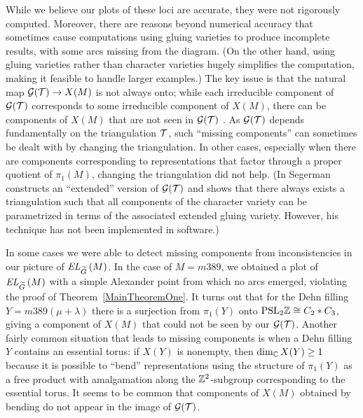\documentclass[tikz, sepfignums, defaultenums]{nmd/article}
\newcommand{\TEL}[1]{\mathit{EL}_\Gtil\left(#1\right)}
\begin{document}
While we believe our plots of these loci are accurate, they were not
rigorously computed.  Moreover, there are reasons beyond numerical
accuracy that sometimes cause computations using gluing varieties to
produce incomplete results, with some arcs missing from the diagram.
(On the other hand, using gluing varieties rather than character
varieties hugely simplifies the computation, making it feasible to
handle larger examples.)  The key issue is that the natural map
${\mathcal G}({\mathcal T}) \to X(M)$ is not always onto; while each irreducible
component of ${\mathcal G}({\mathcal T})$ corresponds to some irreducible component of
$X(M)$, there can be components of $X(M)$ that are not seen in
${\mathcal G}({\mathcal T})$ \cite[\S 10.3]{Dunfield2003}.  As ${\mathcal G}({\mathcal T})$ depends
fundamentally on the triangulation ${\mathcal T}$, such ``missing components''
can sometimes be dealt with by changing the triangulation.  In other
cases, especially when there are components corresponding to
representations that factor through a proper quotient of $\pi_1(M)$,
changing the triangulation did not help.  (In \cite{Segerman2012}
Segerman constructs an ``extended'' version of ${\mathcal G}({\mathcal T})$ and shows
that there always exists a triangulation such that all components of
the character variety can be parametrized in terms of the associated
extended gluing variety. However, his technique has not been
implemented in software.)

In some cases we were able to detect missing components from
inconsistencies in our picture of $\TEL{M}$.  In the case of
$M = m389$, we obtained a plot of $\TEL{M}$ with a simple Alexander
point from which no arcs emerged, violating the proof of
Theorem~\ref{MainTheoremOne}.  It turns out that for the Dehn filling
$Y = m389(\mu + \lambda)$ there is a surjection from $\pi_1(Y)$ onto
$\mathrm{PSL}_{2} {\mathbb Z} \cong C_2 * C_3$, giving a component of $X(M)$ that could
not be seen by our ${\mathcal G}({\mathcal T})$.  Another fairly common situation that
leads to missing components is when a Dehn filling $Y$ contains an
essential torus: if $X(Y)$ is nonempty, then $\dim_{\mathbb C} X(Y) \geq 1$
because it is possible to ``bend'' representations using the structure
of $\pi_1(Y)$ as a free product with amalgamation along the
${\mathbb Z}^2$-subgroup corresponding to the essential torus.  It seems to be
common that components of $X(M)$ obtained by bending do not appear in
the image of ${\mathcal G}({\mathcal T})$.
\end{document}
